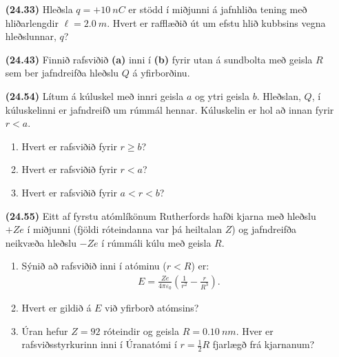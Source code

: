 \begin{enumerate}[label = \textbf{(\alph*)}]

\item[\textbf{(24.33)}] Hleðsla $q = +\SI{10}{nC}$ er stödd í miðjunni á jafnhliða tening með hliðarlengdir $\ell = \SI{2.0}{m}$. Hvert er rafflæðið út um efstu hlið kubbsins vegna hleðslunnar, $q$?

\item[\textbf{(24.43)}] Finnið rafsviðið \textbf{(a)} inni í \textbf{(b)} fyrir utan á sundbolta með geisla $R$ sem ber jafndreifða hleðslu $Q$ á yfirborðinu.

\item[\textbf{(24.54)}] Lítum á kúluskel með innri geisla $a$ og ytri geisla $b$. Hleðslan, $Q$, í kúluskelinni er jafndreifð um rúmmál hennar. Kúluskelin er hol að innan fyrir $r < a$.
\begin{enumerate}[label = \textbf{(\alph*)}]
    \item Hvert er rafsviðið fyrir $r \geq b$?
    \item Hvert er rafsviðið fyrir $r < a$?
    \item Hvert er rafsviðið fyrir $a < r < b$?
\end{enumerate}

\item[\textbf{(24.55)}] Eitt af fyrstu atómlíkönum Rutherfords hafði kjarna með hleðslu $+Ze$ í miðjunni (fjöldi róteindanna var þá heiltalan $Z$) og jafndreifða neikvæða hleðslu $-Ze$ í rúmmáli kúlu með geisla $R$.
\begin{enumerate}[label = \textbf{(\alph*)}]
    \item Sýnið að rafsviðið inni í atóminu ($r < R$) er:
    \begin{align*}
        E = \frac{Ze}{4\pi \varepsilon_0} \left( \frac{1}{r^2} - \frac{r}{R^3} \right).
    \end{align*}
    \item Hvert er gildið á $E$ við yfirborð atómsins?
    \item Úran hefur $Z = 92$ róteindir og geisla $R = \SI{0.10}{nm}$. Hver er rafsviðsstyrkurinn inni í Úranatómi í $r = \frac{1}{2}R$ fjarlægð frá kjarnanum?
\end{enumerate}


\end{enumerate}

